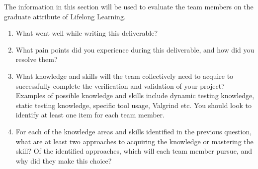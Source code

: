 \documentclass[12pt, titlepage]{article}
\begin{document}
The information in this section will be used to evaluate the team members on the
graduate attribute of Lifelong Learning.



\begin{enumerate}
  \item What went well while writing this deliverable? 
  \item What pain points did you experience during this deliverable, and how
    did you resolve them?
  \item What knowledge and skills will the team collectively need to acquire to
  successfully complete the verification and validation of your project?
  Examples of possible knowledge and skills include dynamic testing knowledge,
  static testing knowledge, specific tool usage, Valgrind etc.  You should look to
  identify at least one item for each team member.
  \item For each of the knowledge areas and skills identified in the previous
  question, what are at least two approaches to acquiring the knowledge or
  mastering the skill?  Of the identified approaches, which will each team
  member pursue, and why did they make this choice?
\end{enumerate}
\end{document}
